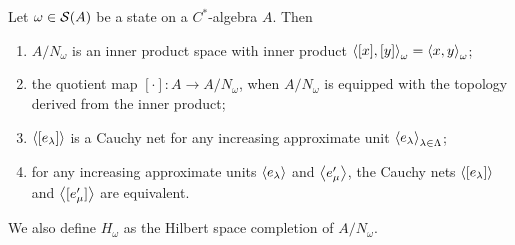 \begin{lemma} \label{GNSlemma}
Let $\omega\in\operatorname{\mathcal{S}}(A)$ be a state on a $C^*$-algebra $A$. Then
\begin{enumerate}
\item $A/N_\omega$ is an inner product space with inner product $\inner{[x], [y]}_\omega = \inner{x,y}_\omega$;
\item the quotient map $[\cdot]: A\to A/N_\omega$, when $A/N_\omega$ is equipped with the topology derived from the inner product;
\item $\left\langle [e_\lambda] \right\rangle$ is a Cauchy net for any increasing approximate unit $\left\langle e_\lambda \right\rangle_{\lambda\in\Lambda}$;
\item for any increasing approximate units $\left\langle e_\lambda \right\rangle$ and $\left\langle e'_\mu \right\rangle$, the Cauchy nets $\left\langle [e_\lambda] \right\rangle$ and $\left\langle [e'_\mu] \right\rangle$ are equivalent.
\end{enumerate}
\end{lemma}
We also define $H_\omega$ as the Hilbert space completion of $A/N_\omega$.
